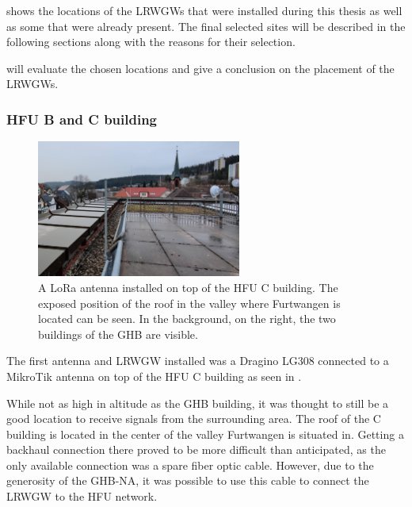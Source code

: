  shows the locations of the \aclp{LRWGW} that were installed during this thesis as well as some that were already present.
The final selected sites will be described in the following sections along with the reasons for their selection.

 will evaluate the chosen locations and give a conclusion on the placement of the \aclp{LRWGW}.

\subsubsection{\acl{HFU} B and C building}

\begin{figure}[htbp]
    \centering
    \includegraphics[width=0.6\textwidth]{pictures/hardware/gateway-deployment/mikrotik-antenna-c-building.jpg}
    \caption[\acl{LoRa} antenna installed on top of the \acl{HFU} C building]{
        A \ac{LoRa} antenna installed on top of the \ac{HFU} C building.
        The exposed position of the roof in the valley where Furtwangen is located can be seen.
        In the background, on the right, the two buildings of the \acf{GHB} are visible.
    }\label{pic:mikrotik-antenna-c-building}
\end{figure}

The first antenna and \acl{LRWGW} installed was a Dragino LG308 connected to a MikroTik antenna on top of the \ac{HFU} C building as seen in .

While not as high in altitude as the \ac{GHB} building, it was thought to still be a good location to receive signals from the surrounding area.
The roof of the C building is located in the center of the valley Furtwangen is situated in.
Getting a backhaul connection there proved to be more difficult than anticipated, as the only available connection was a spare fiber optic cable.
However, due to the generosity of the \acl{GHB-NA}, it was possible to use this cable to connect the \acl{LRWGW} to the \ac{HFU} network.

